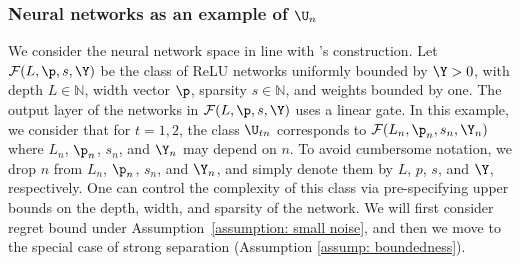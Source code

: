 \documentclass[preprint] {imsart}
\begin{document}
\subsubsection{Neural networks as an example of $\U_n$ }
   \label{ex; neural network}
   
We consider the neural network space in line with \cite{schmidt2020}'s construction. Let ${\mathcal F}(L,\p,s,\Y)$ be the class of ReLU networks uniformly bounded by $\Y>0$, with depth  $L\in\mathbb N$,  width vector $\p$, sparsity $s\in\mathbb N$, and weights bounded by one. The output layer of the networks in ${\mathcal F}(L,\p,s,\Y)$ uses a linear gate. 
In this example,  we  consider that for $t=1,2$, the class $\U_{tn}$ corresponds to ${\mathcal F}(L_n,\p_n,s_n,\Y_n)$ where $L_n$, $\p_n$, $s_n$, and $\Y_n$ may depend on $n$. To avoid cumbersome notation, we drop $n$ from $L_n$, $\p_n$, $s_n$, and $\Y_n$, and simply denote them by $L$, $p$, $s$, and $\Y$, respectively. One can control the complexity of this class via pre-specifying upper bounds on the depth, width, and sparsity of the network.  We will first consider regret bound under Assumption~\ref{assumption: small noise}, and then we move to the special case of strong separation (Assumption \ref{assump: boundedness}).
\end{document}
